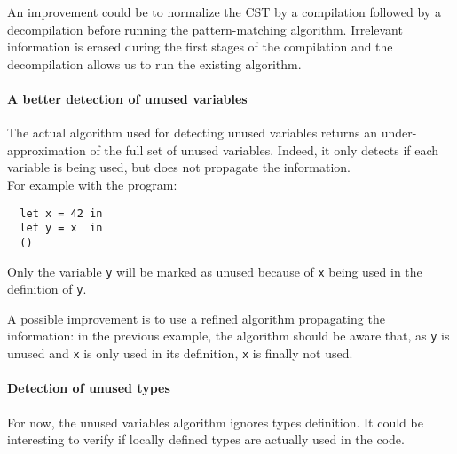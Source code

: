 \documentclass[10pt,a4paper]{article}
\begin{document}
An improvement could be to normalize the CST by a compilation followed by a decompilation before running the pattern-matching algorithm. Irrelevant information is erased during the first stages of the compilation and the decompilation allows us to run the existing algorithm.

\paragraph{A better detection of unused variables}

The actual algorithm used for detecting unused variables returns an under-approximation of the full set of unused variables. Indeed, it only detects if each variable is being used, but does not propagate the information.\\
For example with the program:
\begin{verbatim}
  let x = 42 in
  let y = x  in
  ()
\end{verbatim}
Only the variable \verb|y| will be marked as unused because of \verb|x| being used in the definition of \verb|y|.

A possible improvement is to use a refined algorithm propagating the information: in the previous example, the algorithm should be aware that, as \verb|y| is unused and \verb|x| is only used in its definition, \verb|x| is finally not used.

\paragraph{Detection of unused types}

For now, the unused variables algorithm ignores types definition. It could be interesting to verify if locally defined types are actually used in the code.
\end{document}

